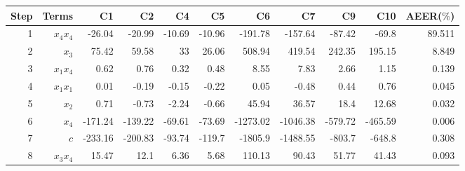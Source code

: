 \begin{tabular}{rrrrrrrrrrr}
Step & Terms & C1 & C2 & C4 & C5 & C6 & C7 & C9 & C10 & AEER($\%$) \\ 
\hline 
1 & $x_4 x_4$ & -26.04 & -20.99 & -10.69 & -10.96 & -191.78 & -157.64 & -87.42 & -69.8 & 89.511 \\ 
2 & $x_3$ & 75.42 & 59.58 & 33 & 26.06 & 508.94 & 419.54 & 242.35 & 195.15 & 8.849 \\ 
3 & $x_1 x_4$ & 0.62 & 0.76 & 0.32 & 0.48 & 8.55 & 7.83 & 2.66 & 1.15 & 0.139 \\ 
4 & $x_1 x_1$ & 0.01 & -0.19 & -0.15 & -0.22 & 0.05 & -0.48 & 0.44 & 0.76 & 0.045 \\ 
5 & $x_2$ & 0.71 & -0.73 & -2.24 & -0.66 & 45.94 & 36.57 & 18.4 & 12.68 & 0.032 \\ 
6 & $x_4$ & -171.24 & -139.22 & -69.61 & -73.69 & -1273.02 & -1046.38 & -579.72 & -465.59 & 0.006 \\ 
7 & $c$ & -233.16 & -200.83 & -93.74 & -119.7 & -1805.9 & -1488.55 & -803.7 & -648.8 & 0.308 \\ 
8 & $x_3 x_4$ & 15.47 & 12.1 & 6.36 & 5.68 & 110.13 & 90.43 & 51.77 & 41.43 & 0.093 \\ 
\hline 
\end{tabular}